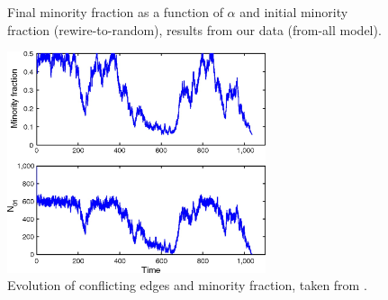 \documentclass[11pt]{article}
\begin{document}
\begin{figure}
  \centering
  \hspace{3mm}
  \caption{Final minority fraction as a function of $\alpha$ and initial minority fraction (rewire-to-random), results from our data (from-all model).}
  \label{fig:myRWtoRandomFromAllBD}
\end{figure}

\begin{figure}
  \centering
  \includegraphics[height=65mm]{durretTimeCourses}
  \caption{Evolution of conflicting edges and minority fraction, taken from \cite{durret:pnas12}.}
  \label{fig:durretTimeCourses}
\end{figure}
\end{document}
